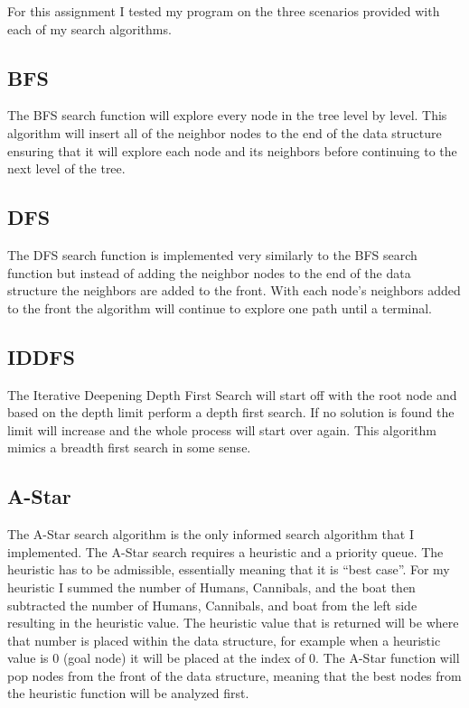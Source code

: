 \documentclass[letterpaper,11pt,notitlepage,fleqn]{article}
\begin{document}
\noindent For this assignment I tested my program on the three scenarios provided with each of my search algorithms.
\subsection{BFS}
The BFS search function will explore every node in the tree level by level. This algorithm will insert all of the neighbor nodes to the end of the data structure ensuring that it will explore each node and its neighbors before continuing to the next level of the tree. 
\subsection{DFS}
The DFS search function is implemented very similarly to the BFS search function but instead of adding the neighbor nodes to the end of the data structure the neighbors are added to the front. With each node's neighbors added to the front the algorithm will continue to explore one path until a terminal.
\subsection{IDDFS}
The Iterative Deepening Depth First Search will start off with the root node and based on the depth limit perform a depth first search. If no solution is found the limit will increase and the whole process will start over again. This algorithm mimics a breadth first search in some sense. 
\subsection{A-Star}
The A-Star search algorithm is the only informed search algorithm that I implemented. The A-Star search requires a heuristic and a priority queue. The heuristic has to be admissible, essentially meaning that it is ``best case''. For my heuristic I summed the number of Humans, Cannibals, and the boat then subtracted the number of Humans, Cannibals, and boat from the left side resulting in the heuristic value. The heuristic value that is returned will be where that number is placed within the data
structure, for example when a heuristic value is 0 (goal node) it will be placed at the index of 0. The A-Star function will pop nodes from the front of the data structure, meaning that the best nodes from the heuristic function will be analyzed first. 
\end{document}
